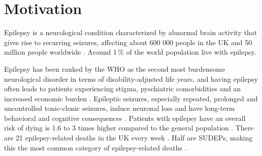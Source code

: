 \section{Motivation}

Epilepsy is a neurological condition characterized by abnormal brain activity that gives rise to recurring seizures, affecting about 600 000 people in the UK and 50 million people worldwide \cite{nice_epilepsies_2012,fiest_prevalence_2017}.
Around 1\,\% of the world population live with epilepsy.

Epilepsy has been ranked by the \ac{WHO} as the second most burdensome neurological disorder in terms of disability-adjusted life years, and
having epilepsy often leads to patients experiencing stigma, pyschiatric comorbidities and an increased economic burden \cite{fiest_prevalence_2017}.
Epileptic seizures, especially repeated, prolonged and uncontrolled tonic-clonic seizures, induce neuronal loss and have long-term behavioral and cognitive consequences \cite{sutula_epileptic_2003}.
Patients with epilepsy have an overall risk of dying is 1.6 to 3 times higher compared to the general population \cite{forsgren_mortality_2005}.
There are 21 epilepsy-related deaths in the UK every week%
.
Half are \acp{SUDEP},  %
making this the most common category of epilepsy-related deaths \cite{devinsky_sudden_2016}.





